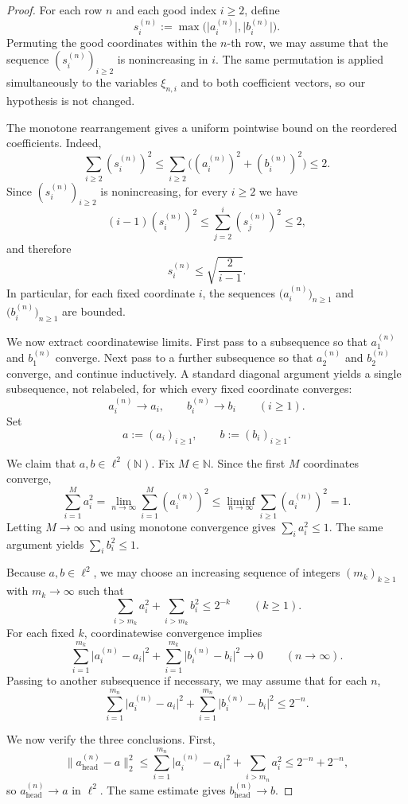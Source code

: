 \documentclass[11pt]{amsart}
\numberwithin{equation}{section}
\theoremstyle{definition}
\theoremstyle{remark}
\newcommand{\N}{\mathbb N}
\newcommand{\abs}[1]{\lvert #1 \rvert}
\newcommand{\norm}[1]{\lVert #1 \rVert}
\begin{document}
\begin{proof}
For each row $n$ and each good index $i\ge2$, define
\[
s_i^{(n)}:=\max\bigl(\abs{a_i^{(n)}},\abs{b_i^{(n)}}\bigr).
\]
Permuting the good coordinates within the $n$-th row, we may assume that the
sequence $(s_i^{(n)})_{i\ge2}$ is nonincreasing in $i$.  The same permutation
is applied simultaneously to the variables $\xi_{n,i}$ and to both coefficient
vectors, so our hypothesis is not changed.

The monotone rearrangement gives a uniform pointwise bound on the reordered
coefficients.  Indeed,
\[
\sum_{i\ge2}(s_i^{(n)})^2
\le
\sum_{i\ge2}\bigl((a_i^{(n)})^2+(b_i^{(n)})^2\bigr)
\le 2.
\]
Since $(s_i^{(n)})_{i\ge2}$ is nonincreasing, for every $i\ge2$ we have
\[
(i-1)(s_i^{(n)})^2
\le \sum_{j=2}^{i}(s_j^{(n)})^2
\le 2,
\]
and therefore
\[
s_i^{(n)}\le \sqrt{\frac{2}{i-1}}.
\]
In particular, for each fixed coordinate $i$, the sequences
$\bigl(a_i^{(n)}\bigr)_{n\ge1}$ and $\bigl(b_i^{(n)}\bigr)_{n\ge1}$ are
bounded.

We now extract coordinatewise limits.  First pass to a subsequence so that
$a_1^{(n)}$ and $b_1^{(n)}$ converge.  Next pass to a further subsequence so
that $a_2^{(n)}$ and $b_2^{(n)}$ converge, and continue inductively.  A
standard diagonal argument yields a single subsequence, not relabeled, for
which every fixed coordinate converges:
\[
a_i^{(n)}\to a_i,
\qquad
b_i^{(n)}\to b_i
\qquad(i\ge1).
\]
Set
\[
a:=(a_i)_{i\ge1},
\qquad
b:=(b_i)_{i\ge1}.
\]

We claim that $a,b\in\ell^2(\N)$.  Fix $M\in\N$.  Since the first $M$
coordinates converge,
\[
\sum_{i=1}^{M} a_i^2
=\lim_{n\to\infty}\sum_{i=1}^{M}(a_i^{(n)})^2
\le \liminf_{n\to\infty}\sum_{i\ge1}(a_i^{(n)})^2
=1.
\]
Letting $M\to\infty$ and using monotone convergence gives
$\sum_i a_i^2\le1$.  The same argument yields $\sum_i b_i^2\le1$.

Because $a,b\in\ell^2$, we may choose an increasing sequence of integers
$(m_k)_{k\ge1}$ with $m_k\to\infty$ such that
\[
\sum_{i>m_k} a_i^2+\sum_{i>m_k} b_i^2\le 2^{-k}
\qquad(k\ge1).
\]
For each fixed $k$, coordinatewise convergence implies
\[
\sum_{i=1}^{m_k}\abs{a_i^{(n)}-a_i}^2
+
\sum_{i=1}^{m_k}\abs{b_i^{(n)}-b_i}^2
\longrightarrow0
\qquad(n\to\infty).
\]
Passing to another subsequence if necessary, we may assume that for each $n$,
\[
\sum_{i=1}^{m_n}\abs{a_i^{(n)}-a_i}^2
+
\sum_{i=1}^{m_n}\abs{b_i^{(n)}-b_i}^2
\le 2^{-n}.
\]

We now verify the three conclusions.  First,
\[
\norm{a_{\mathrm{head}}^{(n)}-a}_2^2
\le
\sum_{i=1}^{m_n}\abs{a_i^{(n)}-a_i}^2
+
\sum_{i>m_n}a_i^2
\le 2^{-n}+2^{-n},
\]
so $a_{\mathrm{head}}^{(n)}\to a$ in $\ell^2$.  The same estimate gives
$b_{\mathrm{head}}^{(n)}\to b$.


\end{proof}
\end{document}
